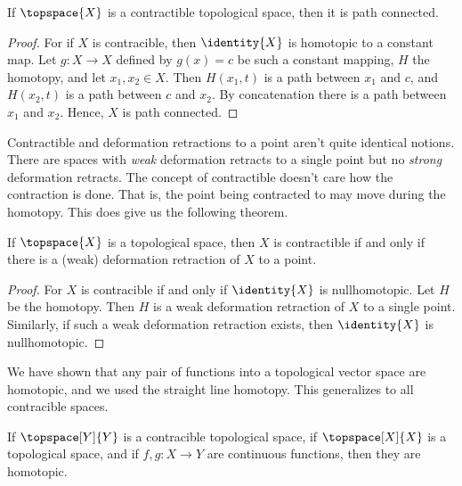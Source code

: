 \documentclass{book}                                                           %
\begin{document}
                \begin{theorem}
                    If $\topspace{X}$ is a contractible topological space, then
                    it is path connected.
                \end{theorem}
                \begin{proof}
                    For if $X$ is contracible, then $\identity{X}$ is homotopic
                    to a constant map. Let $g:X\rightarrow{X}$ defined by
                    $g(x)=c$ be such a constant mapping, $H$ the homotopy, and
                    let $x_{1},x_{2}\in{X}$. Then $H(x_{1},t)$ is a path between
                    $x_{1}$ and $c$, and $H(x_{2},t)$ is a path between
                    $c$ and $x_{2}$. By concatenation there is a path between
                    $x_{1}$ and $x_{2}$. Hence, $X$ is path connected.
                \end{proof}
                Contractible and deformation retractions to a point aren't quite
                identical notions. There are spaces with \textit{weak}
                deformation retracts to a single point but no \textit{strong}
                deformation retracts. The concept of contractible doesn't care
                how the contraction is done. That is, the point being contracted
                to may move during the homotopy. This does give us the following
                theorem.
                \begin{theorem}
                    If $\topspace{X}$ is a topological space, then $X$ is
                    contractible if and only if there is a (weak) deformation
                    retraction of $X$ to a point.
                \end{theorem}
                \begin{proof}
                    For $X$ is contracible if and only if $\identity{X}$ is
                    nullhomotopic. Let $H$ be the homotopy. Then $H$ is a
                    weak deformation retraction of $X$ to a single point.
                    Similarly, if such a weak deformation retraction exists,
                    then $\identity{X}$ is nullhomotopic.
                \end{proof}
                We have shown that any pair of functions into a topological
                vector space are homotopic, and we used the straight line
                homotopy. This generalizes to all contracible spaces.
                \begin{theorem}
                    If $\topspace[Y]{Y}$ is a contracible topological space, if
                    $\topspace[X]{X}$ is a topological space, and if
                    $f,g:X\rightarrow{Y}$ are continuous functions, then they
                    are homotopic.
                \end{theorem}
\end{document}
